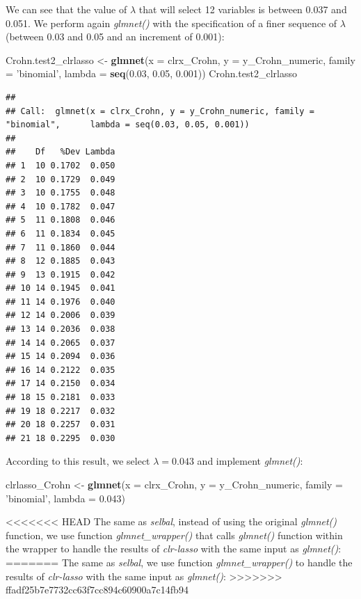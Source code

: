 \documentclass[openany]{book}
\newenvironment{Shaded}{\begin{snugshade}}{\end{snugshade}}
\newcommand{\KeywordTok}[1]{\textcolor[rgb]{0.13,0.29,0.53}{\textbf{#1}}}
\newcommand{\DataTypeTok}[1]{\textcolor[rgb]{0.13,0.29,0.53}{#1}}
\newcommand{\FloatTok}[1]{\textcolor[rgb]{0.00,0.00,0.81}{#1}}
\newcommand{\StringTok}[1]{\textcolor[rgb]{0.31,0.60,0.02}{#1}}
\newcommand{\NormalTok}[1]{#1}
\begin{document}
We can see that the value of \(\lambda\) that will select 12 variables
is between 0.037 and 0.051. We perform again \emph{glmnet()} with the
specification of a finer sequence of \(\lambda\) (between 0.03 and 0.05
and an increment of 0.001):

\begin{Shaded}
\begin{Highlighting}[]
\NormalTok{Crohn.test2_clrlasso <-}\StringTok{ }\KeywordTok{glmnet}\NormalTok{(}\DataTypeTok{x =}\NormalTok{ clrx_Crohn, }\DataTypeTok{y =}\NormalTok{ y_Crohn_numeric, }
                               \DataTypeTok{family =} \StringTok{'binomial'}\NormalTok{, }\DataTypeTok{lambda =} \KeywordTok{seq}\NormalTok{(}\FloatTok{0.03}\NormalTok{, }\FloatTok{0.05}\NormalTok{, }\FloatTok{0.001}\NormalTok{))}
\NormalTok{Crohn.test2_clrlasso}
\end{Highlighting}
\end{Shaded}

\begin{verbatim}
## 
## Call:  glmnet(x = clrx_Crohn, y = y_Crohn_numeric, family = "binomial",      lambda = seq(0.03, 0.05, 0.001)) 
## 
##    Df   %Dev Lambda
## 1  10 0.1702  0.050
## 2  10 0.1729  0.049
## 3  10 0.1755  0.048
## 4  10 0.1782  0.047
## 5  11 0.1808  0.046
## 6  11 0.1834  0.045
## 7  11 0.1860  0.044
## 8  12 0.1885  0.043
## 9  13 0.1915  0.042
## 10 14 0.1945  0.041
## 11 14 0.1976  0.040
## 12 14 0.2006  0.039
## 13 14 0.2036  0.038
## 14 14 0.2065  0.037
## 15 14 0.2094  0.036
## 16 14 0.2122  0.035
## 17 14 0.2150  0.034
## 18 15 0.2181  0.033
## 19 18 0.2217  0.032
## 20 18 0.2257  0.031
## 21 18 0.2295  0.030
\end{verbatim}

According to this result, we select \(\lambda = 0.043\) and implement
\emph{glmnet()}:

\begin{Shaded}
\begin{Highlighting}[]
\NormalTok{clrlasso_Crohn <-}\StringTok{ }\KeywordTok{glmnet}\NormalTok{(}\DataTypeTok{x =}\NormalTok{ clrx_Crohn, }\DataTypeTok{y =}\NormalTok{ y_Crohn_numeric, }
                         \DataTypeTok{family =} \StringTok{'binomial'}\NormalTok{, }\DataTypeTok{lambda =} \FloatTok{0.043}\NormalTok{)}
\end{Highlighting}
\end{Shaded}

<<<<<<< HEAD
The same as \emph{selbal}, instead of using the original \emph{glmnet()}
function, we use function \emph{glmnet\_wrapper()} that calls
\emph{glmnet()} function within the wrapper to handle the results of
\emph{clr-lasso} with the same input as \emph{glmnet()}:
=======
The same as \emph{selbal}, we use function \emph{glmnet\_wrapper()} to
handle the results of \emph{clr-lasso} with the same input as
\emph{glmnet()}:
>>>>>>> ffadf25b7e7732cc63f7cc894c60900a7c14fb94
\end{document}
